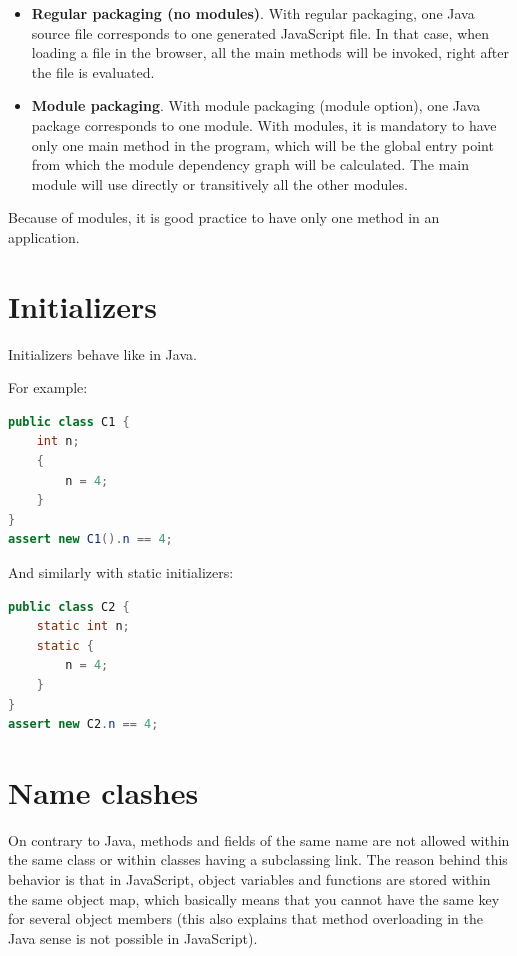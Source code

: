 \documentclass[a4paper]{report}
\begin{document}
\begin{itemize}
\item \textbf{Regular packaging (no modules)}. With regular packaging, one Java source file corresponds to one generated JavaScript file. In that case, when loading a file in the browser, all the main methods will be invoked, right after the file is evaluated. 
\item \textbf{Module packaging}. With module packaging (module option), one Java package corresponds to one module. With modules, it is mandatory to have only one main method in the program, which will be the global entry point from which the module dependency graph will be calculated. The main module will use directly or transitively all the other modules.
\end{itemize}

Because of modules, it is good practice to have only one method in an application.

\section{Initializers}

Initializers behave like in Java.

\noindent
For example:

\begin{lstlisting}[language=Java]
public class C1 {
	int n;
	{
		n = 4;
	}
}
assert new C1().n == 4;
\end{lstlisting}

\noindent
And similarly with static initializers:

\begin{lstlisting}[language=Java]
public class C2 {
	static int n;
	static {
		n = 4;
	}
}
assert new C2.n == 4;
\end{lstlisting}


\section{Name clashes}

On contrary to Java, methods and fields of the same name are not allowed within the same class or within classes having a subclassing link. The reason behind this behavior is that in JavaScript, object variables and functions are stored within the same object map, which basically means that you cannot have the same key for several object members (this also explains that method overloading in the Java sense is not possible in JavaScript).
\end{document}
